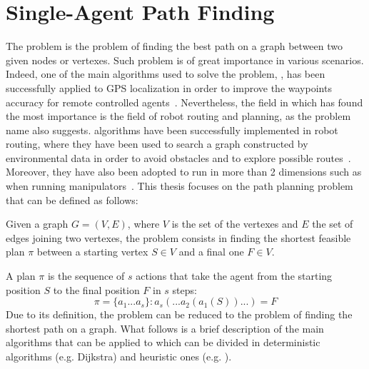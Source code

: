 \section{Single-Agent Path Finding}
\label{sec:SAPF}
The  problem is the problem of finding the best path on a graph 
between two given nodes or vertexes. Such problem is of great importance in 
various scenarios. Indeed, one of the main algorithms used to solve the 
 problem, \astar, has been successfully applied to GPS localization
in order to improve the waypoints accuracy for remote controlled 
agents~\cite{astar_gps}. Nevertheless, the field in which  has found
the most importance is the field of robot routing and planning, as the problem 
name also suggests.  algorithms have been successfully implemented
in robot routing, where they have been used to search a graph constructed by
environmental data in order to avoid obstacles and to explore possible
routes~\cite{robot_routing}. Moreover, they have also been adopted to run in
more than 2 dimensions such as when running manipulators~\cite{robot_mani}.
\newline
This thesis focuses on the path planning problem that can be defined as 
follows:
\begin{definition}
Given a graph $G = (V,E)$, where $V$ is the set of the vertexes and $E$ the set
of edges joining two vertexes, the  problem consists in finding the
shortest feasible plan $\pi$ between a starting vertex $S\in V$ and a final one 
$F\in V$. 
\end{definition}
A plan $\pi$ is the sequence of $s$ actions that take the agent from the 
starting position $S$ to the final position $F$ in $s$ steps:
\[ \pi=\{a_1...a_s\} : a_s(...a_2(a_1(S))...)=F \]
Due to its definition, the  problem can be reduced to the problem of
finding the shortest path on a graph. What follows is a brief description of
the main algorithms that can be applied to  which can be divided in
deterministic algorithms (e.g. Dijkstra) and heuristic ones (e.g. \astar).
%
%
